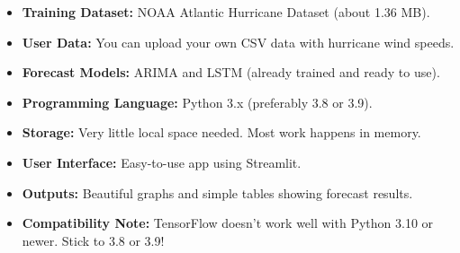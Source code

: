 \begin{itemize}
	\item \textbf{Training Dataset:} NOAA Atlantic Hurricane Dataset (about 1.36 MB).
	\item \textbf{User Data:} You can upload your own CSV data with hurricane wind speeds.
	\item \textbf{Forecast Models:} ARIMA and LSTM (already trained and ready to use).
	\item \textbf{Programming Language:} Python 3.x (preferably 3.8 or 3.9).
	\item \textbf{Storage:} Very little local space needed. Most work happens in memory.
	\item \textbf{User Interface:} Easy-to-use app using Streamlit.
	\item \textbf{Outputs:} Beautiful graphs and simple tables showing forecast results.
	\item \textbf{Compatibility Note:} TensorFlow doesn't work well with Python 3.10 or newer. Stick to 3.8 or 3.9!
\end{itemize}
